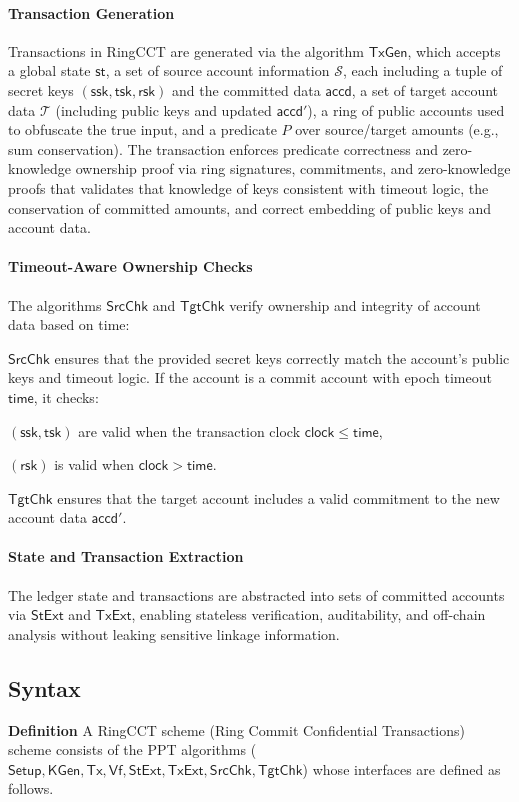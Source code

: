 \paragraph*{Transaction Generation}
Transactions in RingCCT are generated via the algorithm $\mathsf{TxGen}$, which accepts a global state $\mathsf{st}$, a set of source account information $\mathcal{S}$, each including a tuple of secret keys $(\mathsf{ssk}, \mathsf{tsk}, \mathsf{rsk})$ and the committed data $\mathsf{accd}$, a set of target account data $\mathcal{T}$ (including public keys and updated $\mathsf{accd}'$), a ring of public accounts used to obfuscate the true input, and a predicate $P$ over source/target amounts (e.g., sum conservation).
The transaction enforces predicate correctness and zero-knowledge ownership proof via ring signatures, commitments, and zero-knowledge proofs that validates that knowledge of keys consistent with timeout logic, the conservation of committed amounts, and correct embedding of public keys and account data.

\paragraph*{Timeout-Aware Ownership Checks}
The algorithms $\mathsf{SrcChk}$ and $\mathsf{TgtChk}$ verify ownership and integrity of account data based on time:

$\mathsf{SrcChk}$ ensures that the provided secret keys correctly match the account’s public keys and timeout logic. If the account is a commit account with epoch timeout $\mathsf{time}$, it checks:

$(\mathsf{ssk}, \mathsf{tsk})$ are valid when the transaction clock $\mathsf{clock} \leq \mathsf{time}$,

$(\mathsf{rsk})$ is valid when $\mathsf{clock} > \mathsf{time}$.

$\mathsf{TgtChk}$ ensures that the target account includes a valid commitment to the new account data $\mathsf{accd}'$.

\paragraph*{State and Transaction Extraction}
The ledger state and transactions are abstracted into sets of committed accounts via $\mathsf{StExt}$ and $\mathsf{TxExt}$, enabling stateless verification, auditability, and off-chain analysis without leaking sensitive linkage information.

\subsection{Syntax}
\textbf{Definition} A RingCCT scheme (Ring Commit Confidential Transactions) scheme consists of the PPT algorithms ($\mathsf{Setup},\mathsf{KGen,Tx,Vf,StExt,TxExt,SrcChk,TgtChk}$) whose interfaces are defined as follows.


